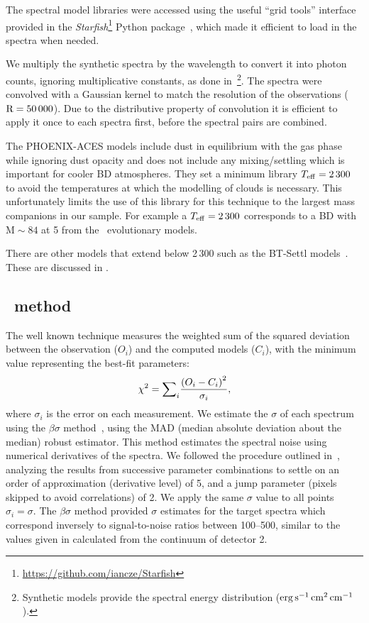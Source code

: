 

The spectral model libraries were accessed using the useful ``grid tools'' interface provided in the \emph{Starfish}\footnote{\url{https://github.com/iancze/Starfish}} Python package~\citep{czekala_constructing_2015}, which made it efficient to load in the spectra when needed.

We multiply the synthetic spectra by the wavelength to convert it into photon counts, ignoring multiplicative constants, as done in~\citet{figueira_radial_2016}\footnote{Synthetic models provide the spectral energy distribution (\(\rm erg\,s^{-1}\,cm^{2}\,cm^{-1}\)).}. The spectra were convolved with a Gaussian kernel to match the resolution of the observations (\(\rm R=50\,000\)). Due to the distributive property of convolution it is efficient to apply it once to each spectra first, before the spectral pairs are combined.

The {PHOENIX-ACES} models include dust in equilibrium with the gas phase while ignoring dust opacity and does not include any mixing/settling which is important for cooler {BD} atmospheres.
They set a minimum library \(T_{\mathrm{eff}}{}=2\,300\)\K{} to avoid the temperatures at which the modelling of clouds is necessary.
This unfortunately limits the use of this library for this technique to the largest mass companions in our sample.
For example a \(T_{\mathrm{eff}}{}=2\,300\)\K{} corresponds to a {BD} with \(\textrm{M}\sim84\)\Mjup{} at 5\Gyr{} from the~\citet{baraffe_evolutionary_2003} evolutionary models.

There are other models that extend below 2\,300\K{} such as the {BT-Settl} models~\citep{allard_btsettl_2013,baraffe_new_2015}. These are discussed in .


\subsection{\texorpdfstring{\textchisquared}\ \ method}
\label{subsec:chi2}
The well known \textchisquared{} technique measures the weighted sum of the squared deviation between the observation (\({O}_{i}\)) and the computed models (\(C_{i}\)), with the minimum \textchisquared{} value representing the best-fit parameters:
\[{\chi}^{2} = {\sum}_i \frac{{(O_{i} - C_{i})}^2}{{\sigma}_{i}},\] where \({\sigma}_{i}\) is the error on each measurement. We estimate the \(\sigma\) of each spectrum using the \(\beta\sigma\) method~\citep{czesla_posteriori_2018}, using the MAD (median absolute deviation about the median) robust estimator. {\red{} This method estimates the spectral noise using numerical derivatives of the spectra. We followed the procedure outlined in~\citet{czesla_posteriori_2018}, analyzing the results from successive parameter combinations to settle on an order of approximation (derivative level) of 5, and a jump parameter (pixels skipped to avoid correlations) of 2.} We apply the same \(\sigma\) value to all points \({\sigma}_{i} = \sigma\).
The \(\beta\sigma\) method provided \(\sigma\) estimates for the target spectra which correspond inversely to signal-to-noise ratios between 100--500, {\red{} similar to the values given in  calculated from the continuum of detector 2.}

